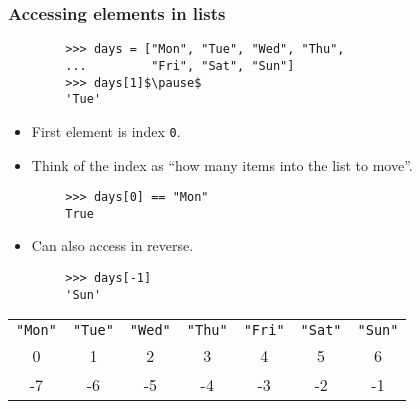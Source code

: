 \documentclass[notes]{beamer}
\begin{document}
	\begin{frame}[fragile]
		\frametitle{Accessing elements in lists}

		
		\begin{lstlisting}
		>>> days = ["Mon", "Tue", "Wed", "Thu",
		...         "Fri", "Sat", "Sun"]
		>>> days[1]$\pause$
		'Tue'
		\end{lstlisting}
		
		\pause
		
		\vspace{-3mm}
		
		\begin{itemize}
			\item First element is index \lstinline|0|.
			\item Think of the index as ``how many items into the list to move''.
		\end{itemize}
		
		\begin{lstlisting}
		>>> days[0] == "Mon"
		True
		\end{lstlisting}

		\pause
		
		\vspace{-3mm}
		
		\begin{itemize}
			\item Can also access in reverse.
		\end{itemize}
		
		\begin{lstlisting}
		>>> days[-1]
		'Sun'
		\end{lstlisting}
	
		
		\pause
		
		\begin{table}
			\vspace{-2mm}
			\centering
			\begin{tabular}[c]{ccccccc}
				\lstinline|"Mon"| & \lstinline|"Tue"| & \lstinline|"Wed"| & \lstinline|"Thu"| & \lstinline|"Fri"| & \lstinline|"Sat"| & \lstinline|"Sun"| \\
				0 & 1 & 2 & 3 & 4 & 5 & 6 \\
				-7 & -6 & -5 & -4 & -3 & -2 & -1
			\end{tabular}
		\end{table}
	\end{frame}
	
\end{document}
